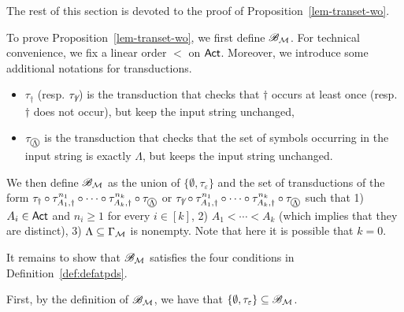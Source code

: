 The rest of this section is devoted to the proof of Proposition~\ref{lem-transet-wo}.

To prove Proposition~\ref{lem-transet-wo}, we first define ${\mathscr{B} }_{\mathcal{M} }$.
For technical convenience, we fix a linear order $<$ on ${\sf Act}$. Moreover, we introduce some additional notations for transductions.
\begin{itemize}
\item $\tau_\dag$ (resp. $\tau_{\not \dag}$) is the transduction that checks that $\dag$ occurs at least once (resp. $\dag$ does not occur), but keep the input string unchanged, 
%
\item $\tau_{\mathcircled{\Lambda}}$ is the transduction that checks that the set of symbols occurring in the input string is exactly $\Lambda$, %
but keeps the input string unchanged. 
\end{itemize}

We then define ${\mathscr{B} }_{\mathcal{M} }$ as the union of $\{\emptyset, \tau_\varepsilon\}$ and the set of transductions of the  form $\tau_{\dag} \circ \tau^{n_1}_{A_1, \dag} \circ \cdots \circ \tau^{n_k}_{A_k, \dag} \circ \tau_{\mathcircled{\Lambda}}$ or $\tau_{\not \dag} \circ \tau^{n_1}_{A_1, \dag} \circ \cdots \circ \tau^{n_k}_{A_k, \dag} \circ \tau_{\mathcircled{\Lambda}}$ such that 
1) $A_i \in {\sf Act}$ and $n_i \ge 1$ for every $i \in [k]$, 
2) $A_1 < \cdots < A_k$ (which implies that they are distinct), 
3) $\Lambda \subseteq \Gamma_{\mathcal{M} }$ is nonempty. Note that here it is possible that $k=0$.

It remains to show that ${\mathscr{B} }_{\mathcal{M} }$ satisfies the four conditions in Definition~\ref{def:defatpds}.

First, by the definition of ${\mathscr{B} }_{\mathcal{M} }$, we have that $\{\emptyset, \tau_{\varepsilon}\} \subseteq {\mathscr{B} }_{\mathcal{M} }$.

